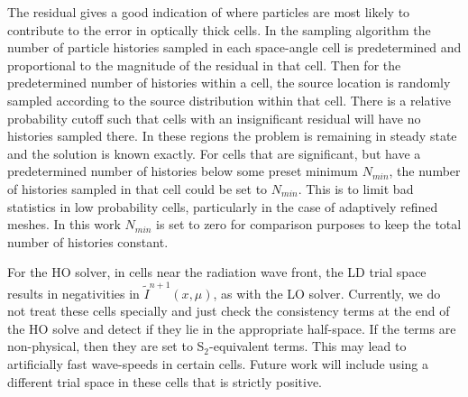 \documentclass{mc2013}
\begin{document}
The residual gives a good indication of where
particles are most likely to contribute to the error in optically thick cells.
In the sampling algorithm the number of particle histories sampled in
each space-angle cell is predetermined and proportional to the magnitude of the
residual in that cell.  Then for the predetermined number of histories within a cell, the source
location is randomly sampled according to the source distribution within that cell.  There is
a relative probability cutoff such that cells with an insignificant
residual will have no histories sampled there. In these regions the problem is
remaining in steady state and the solution is known exactly.  
For cells that are significant, but have a predetermined number of histories below some preset
minimum $N_{min}$, the number of histories sampled in that cell could be set to
$N_{min}$. This is to limit
bad statistics in low probability cells, particularly in the case of adaptively
refined meshes.  In this work $N_{min}$ is set to zero for comparison purposes to
keep the total number of histories constant. 


For the HO solver, in cells near the radiation wave front, the LD trial space results in negativities in
$\tilde{I}^{n+1}(x,\mu)$, as with the
LO solver.  Currently, we do not treat these cells specially and just check the consistency terms at the end of the HO solve
and detect if they lie in the appropriate half-space.  If the terms are non-physical, then
they are set to S$_2$-equivalent terms.  This may lead to artificially fast
wave-speeds in certain cells.  Future work will include using a different trial space
in these cells that is strictly positive.  
\end{document}
